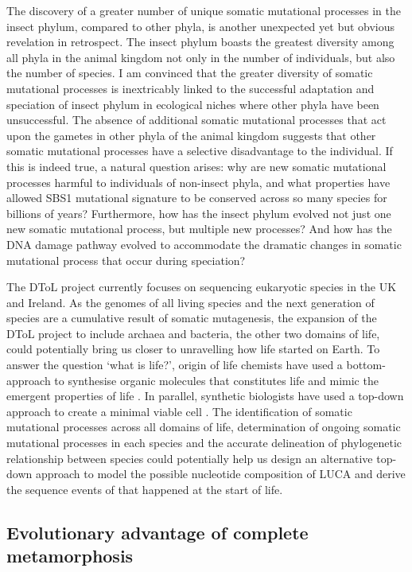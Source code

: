The discovery of a greater number of unique somatic mutational processes in the insect phylum, compared to other phyla, is another unexpected yet but obvious revelation in retrospect. The insect phylum boasts the greatest diversity among all phyla in the animal kingdom not only in the number of individuals, but also the number of species. I am convinced that the greater diversity of somatic mutational processes is inextricably linked to the successful adaptation and speciation of insect phylum in ecological niches where other phyla have been unsuccessful. The absence of additional somatic mutational processes that act upon the gametes in other phyla of the animal kingdom suggests that other somatic mutational processes have a selective disadvantage to the individual. If this is indeed true, a natural question arises: why are new somatic mutational processes harmful to individuals of non-insect phyla, and what properties have allowed SBS1 mutational signature to be conserved across so many species for billions of years? Furthermore, how has the insect phylum evolved not just one new somatic mutational process, but multiple new processes? And how has the DNA damage pathway evolved to accommodate the dramatic changes in somatic mutational process that occur during speciation? 

The DToL project currently focuses on sequencing eukaryotic species in the UK and Ireland. As the genomes of all living species and the next generation of species are a cumulative result of somatic mutagenesis, the expansion of the DToL project to include archaea and bacteria, the other two domains of life, could potentially bring us closer to unravelling how life started on Earth. To answer the question ‘what is life?’, origin of life chemists have used a bottom-approach to synthesise organic molecules that constitutes life and mimic the emergent properties of life \cite{}. In parallel, synthetic biologists have used a top-down approach to create a minimal viable cell \cite{}. The identification of somatic mutational processes across all domains of life, determination of ongoing somatic mutational processes in each species and the accurate delineation of phylogenetic relationship between species could potentially help us design an alternative top-down approach to model the possible nucleotide composition of LUCA and derive the sequence events of that happened at the start of life. 

\subsection{Evolutionary advantage of complete metamorphosis}


